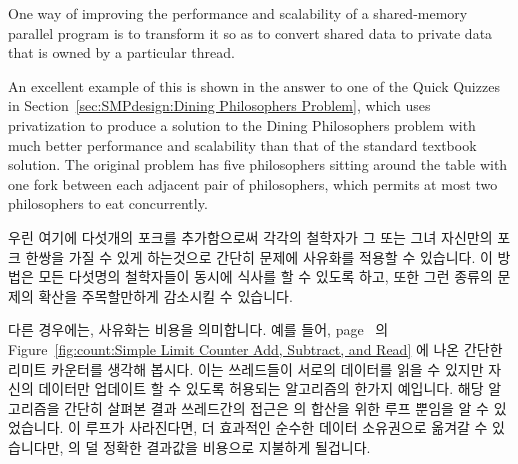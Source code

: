 One way of improving the performance and scalability of a shared-memory
parallel program is to transform it so as to convert shared data to
private data that is owned by a particular thread.

An excellent example of this is shown in the answer to one of the
Quick Quizzes in
Section~\ref{sec:SMPdesign:Dining Philosophers Problem},
which uses privatization to produce a solution to the
Dining Philosophers problem with much better performance and scalability
than that of the standard textbook solution.
The original problem has five philosophers sitting around the table
with one fork between each adjacent pair of philosophers, which permits
at most two philosophers to eat concurrently.
\fi

우린 여기에 다섯개의 포크를 추가함으로써 각각의 철학자가 그 또는 그녀 자신만의
포크 한쌍을 가질 수 있게 하는것으로 간단히 문제에 사유화를 적용할 수 있습니다.
이 방법은 모든 다섯명의 철학자들이 동시에 식사를 할 수 있도록 하고, 또한 그런
종류의 문제의 확산을 주목할만하게 감소시킬 수 있습니다.

다른 경우에는, 사유화는 비용을 의미합니다.
예를 들어,
page~\pageref{fig:count:Simple Limit Counter Add, Subtract, and Read} 의
Figure~\ref{fig:count:Simple Limit Counter Add, Subtract, and Read} 에 나온
간단한 리미트 카운터를 생각해 봅시다.
이는 쓰레드들이 서로의 데이터를 읽을 수 있지만 자신의 데이터만 업데이트 할 수
있도록 허용되는 알고리즘의 한가지 예입니다.
해당 알고리즘을 간단히 살펴본 결과 쓰레드간의 접근은  의
합산을 위한 루프 뿐임을 알 수 있었습니다.
이 루프가 사라진다면, 더 효과적인 순수한 데이터 소유권으로 옮겨갈 수
있습니다만,  의 덜 정확한 결과값을 비용으로 지불하게 될겁니다.
\iffalse

We can trivially privatize this problem by providing an additional five
forks, so that each philosopher has his or her own private pair of forks.
This allows all five philosophers to eat concurrently, and also offers
a considerable reduction in the spread of certain types of disease.

In other cases, privatization imposes costs.
For example, consider the simple limit counter shown in
Figure~\ref{fig:count:Simple Limit Counter Add, Subtract, and Read} on
page~\pageref{fig:count:Simple Limit Counter Add, Subtract, and Read}.
This is an example of an algorithm where threads can read each others'
data, but are only permitted to update their own data.
A quick review of the algorithm shows that the only cross-thread
accesses are in the summation loop in \co{read_count()}.
If this loop is eliminated, we move to the more-efficient pure
data ownership, but at the cost of a less-accurate result
from \co{read_count()}.
\fi

